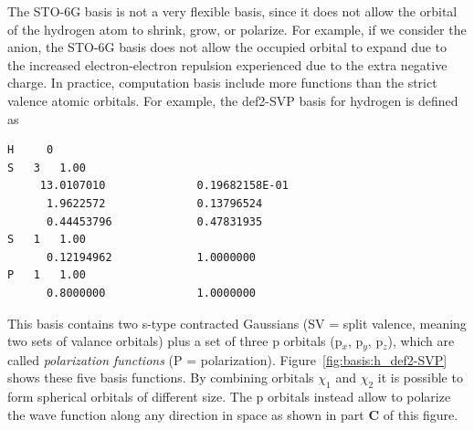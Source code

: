 \documentclass[../Main/chem371-notes.tex]{subfiles}
\begin{document}
The STO-6G basis is not a very flexible basis, since it does not allow the orbital of the hydrogen atom to shrink, grow, or polarize.
For example, if we consider the  anion, the STO-6G basis does not allow the occupied orbital to expand due to the increased electron-electron repulsion experienced due to the extra negative charge.
In practice, computation basis include more functions than the strict valence atomic orbitals.
For example, the def2-SVP basis for hydrogen is defined as
\begin{verbatim}
H     0
S   3   1.00
     13.0107010              0.19682158E-01
      1.9622572              0.13796524
      0.44453796             0.47831935
S   1   1.00
      0.12194962             1.0000000
P   1   1.00
      0.8000000              1.0000000
\end{verbatim}
This basis contains two s-type contracted Gaussians (SV = split valence, meaning two sets of valance orbitals) plus a set of three p orbitals (p$_x$, p$_y$, p$_z$), which are called \emph{polarization functions} (P = polarization).
Figure~\ref{fig:basis:h_def2-SVP} shows these five basis functions.
By combining orbitals $\chi_1$ and $\chi_2$ it is possible to form spherical orbitals of different size.
The p orbitals instead allow to polarize the wave function along any direction in space as shown in part \textbf{C} of this figure.

\end{document}
